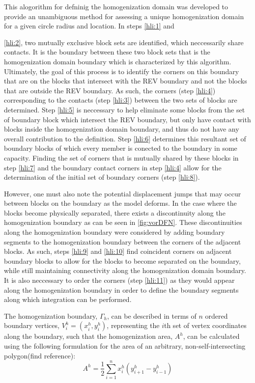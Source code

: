 This alogorithm for defninig the homogenization domain was developed to provide an unambiguous method for assessing a unique homogenization domain for a given circle radius and location. In steps \ref{hli:1} and {\ref{hli:2}, two mutually exclusive block sets are identified, which neccessarily share contacts. It is the boundary between these two block sets that is the homogenization domain boundary which is characterized by this algorithm. Ultimately, the goal of this process is to identify the corners on this boundary that are on the blocks that intersect with the REV boundary and not the blocks that are outside the REV boundary. As such, the corners (step \ref{hli:4}) corresponding to the contacts (step \ref{hli:3}) between the two sets of blocks are determined. Step \ref{hli:5} is neccessary to help eliminate some blocks from the set of boundary block which intersect the REV boundary, but only have contact with blocks inside the homogenization domain boundary, and thus do not have any overall contribution to the definition. Step \ref{hli:6} determines this resultant set of boundary blocks of which every member is conected to the boundary in some capacity. Finding the set of corners that is mutually shared by these blocks in step \ref{hli:7} and the boundary contact corners in step \ref{hli:4} allow for the determination of the initial set of boundary corners (step \ref{hli:8}). 

However, one must also note the potential displacement jumps that may occur between blocks on the boundary as the model deforms. In the case where the blocks become physically separated, there exists a discontinuity along the homogenization boundary as can be seen in \ref{fig:vorDFN}. These discontinuities along the homogenization boundary were considered by adding boundary segments to the homogenization boundary between the corners of the adjacent blocks. As such, steps \ref{hli:9} and \ref{hli:10} find coincident corners on adjacent boundary blocks to allow for the blocks to become separated on the boundary, while still maintaining connectivity along the homogenization domain boundary. It is also neccessary to order the corners (step \ref{hli:11}) as they would appear along the homogenization boundary in order to define the boundary segments along which integration can be performed. 

The homogenization boundary, $\Gamma_{h}$, can be described in terms of $n$ ordered boundary vertices, $V_{i}^{h} = (x_{i}^{h}, y_{i}^{h})$, representing the $i$th set of vertex coordinates along the boundary, such that the homogenization area, $A^h$, can be calculated using the following formulation for the area of an arbitrary, non-self-intersecting polygon(find reference):
\begin{equation}
\label{eqn:hom1}
A^h = \dfrac{1}{2} \sum_{i=1}^{n}x_i^h(y_{i+1}^h-y_{i-1}^h)
\end{equation}

}
